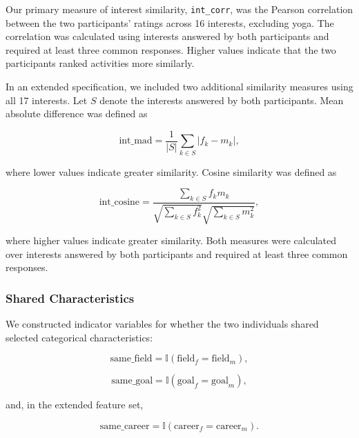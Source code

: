 \documentclass[11pt,letterpaper,reqno]{amsart}
\numberwithin{equation}{subsection}
\theoremstyle{definition}
\numberwithin{thm}{subsection}
\begin{document}
Our primary measure of interest similarity, \texttt{int\_corr}, was the Pearson correlation between the two participants' ratings across 16 interests, excluding yoga. The correlation was calculated using interests answered by both participants and required at least three common responses. Higher values indicate that the two participants ranked activities more similarly.

In an extended specification, we included two additional similarity measures using all 17 interests. Let $S$ denote the interests answered by both participants. Mean absolute difference was defined as

\begin{equation}
\text{int\_mad}
=
\frac{1}{|S|}
\sum_{k\in S}|f_k-m_k|,
\end{equation}

where lower values indicate greater similarity. Cosine similarity was defined as

\begin{equation}
\text{int\_cosine}
=
\frac{\sum_{k\in S}f_km_k}
{\sqrt{\sum_{k\in S}f_k^2}\sqrt{\sum_{k\in S}m_k^2}},
\end{equation}

where higher values indicate greater similarity. Both measures were calculated over interests answered by both participants and required at least three common responses.

\subsubsection{Shared Characteristics}

We constructed indicator variables for whether the two individuals shared selected categorical characteristics:

\begin{equation}
\text{same\_field}
=
\mathbb{I}
\left(
\text{field}_{f}
=
\text{field}_{m}
\right),
\end{equation}

\begin{equation}
\text{same\_goal}
=
\mathbb{I}
\left(
\text{goal}_{f}
=
\text{goal}_{m}
\right),
\end{equation}

and, in the extended feature set,

\begin{equation}
\text{same\_career}
=
\mathbb{I}
\left(
\text{career}_{f}
=
\text{career}_{m}
\right).
\end{equation}
\end{document}
